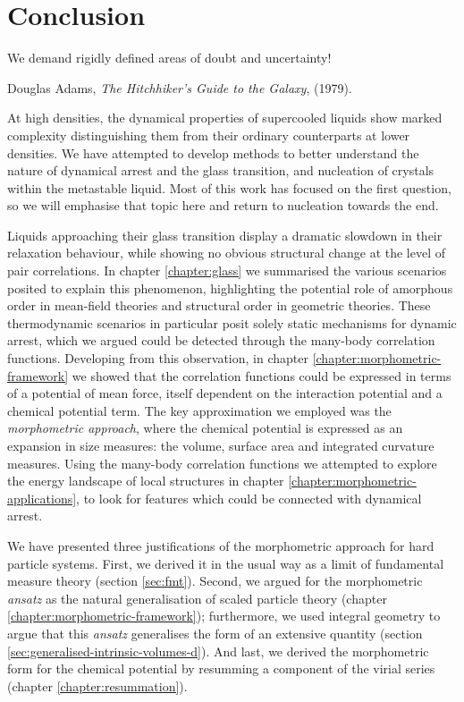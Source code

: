 \documentclass[11pt,twoside]{report}
\begin{document}
\chapter{Conclusion}
\epigraph{We demand rigidly defined areas of doubt and uncertainty!}{Douglas Adams, \emph{The Hitchhiker's Guide to the Galaxy}, (1979).}

At high densities, the dynamical properties of supercooled liquids show marked complexity distinguishing them from their ordinary counterparts at lower densities.
We have attempted to develop methods to better understand the nature of dynamical arrest and the glass transition, and nucleation of crystals within the metastable liquid.
Most of this work has focused on the first question, so we will emphasise that topic here and return to nucleation towards the end.


Liquids approaching their glass transition display a dramatic slowdown in their relaxation behaviour, while showing no obvious structural change at the level of pair correlations.
In chapter \ref{chapter:glass} we summarised the various scenarios posited to explain this phenomenon, highlighting the potential role of amorphous order in mean-field theories and structural order in geometric theories.
These thermodynamic scenarios in particular posit solely static mechanisms for dynamic arrest, which we argued could be detected through the many-body correlation functions.
Developing from this observation, in chapter \ref{chapter:morphometric-framework} we showed that the correlation functions could be expressed in terms of a potential of mean force, itself dependent on the interaction potential and a chemical potential term.
The key approximation we employed was the \emph{morphometric approach}, where the chemical potential is expressed as an expansion in size measures: the volume, surface area and integrated curvature measures.
Using the many-body correlation functions we attempted to explore the energy landscape of local structures in chapter \ref{chapter:morphometric-applications}, to look for features which could be connected with dynamical arrest.


We have presented three justifications of the morphometric approach for hard particle systems.
First, we derived it in the usual way as a limit of fundamental measure theory (section \ref{sec:fmt}).
Second, we argued for the morphometric \emph{ansatz} as the natural generalisation of scaled particle theory (chapter \ref{chapter:morphometric-framework}); furthermore, we used integral geometry to argue that this \emph{ansatz} generalises the form of an extensive quantity (section \ref{sec:generalised-intrinsic-volumes-d}).
And last, we derived the morphometric form for the chemical potential by resumming a component of the virial series (chapter \ref{chapter:resummation}).
\end{document}
